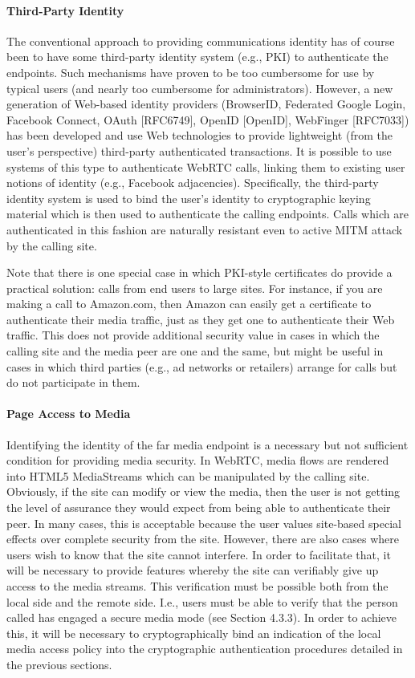 \documentclass{article}
\begin{document}
\paragraph{Third-Party Identity}

The conventional approach to providing communications identity has of
course been to have some third-party identity system (e.g., PKI) to
authenticate the endpoints.  Such mechanisms have proven to be too
cumbersome for use by typical users (and nearly too cumbersome for
administrators).  However, a new generation of Web-based identity
providers (BrowserID, Federated Google Login, Facebook Connect, OAuth
[RFC6749], OpenID [OpenID], WebFinger [RFC7033]) has been developed
and use Web technologies to provide lightweight (from the user's
perspective) third-party authenticated transactions.  It is possible
to use systems of this type to authenticate WebRTC calls, linking
them to existing user notions of identity (e.g., Facebook
adjacencies).  Specifically, the third-party identity system is used
to bind the user's identity to cryptographic keying material which is
then used to authenticate the calling endpoints.  Calls which are
authenticated in this fashion are naturally resistant even to active
MITM attack by the calling site.

Note that there is one special case in which PKI-style certificates
do provide a practical solution: calls from end users to large sites.
For instance, if you are making a call to Amazon.com, then Amazon can
easily get a certificate to authenticate their media traffic, just as
they get one to authenticate their Web traffic.  This does not
provide additional security value in cases in which the calling site
and the media peer are one and the same, but might be useful in cases
in which third parties (e.g., ad networks or retailers) arrange for
calls but do not participate in them.

\paragraph{Page Access to Media}

Identifying the identity of the far media endpoint is a necessary but
not sufficient condition for providing media security.  In WebRTC,
media flows are rendered into HTML5 MediaStreams which can be
manipulated by the calling site.  Obviously, if the site can modify
or view the media, then the user is not getting the level of
assurance they would expect from being able to authenticate their
peer.  In many cases, this is acceptable because the user values
site-based special effects over complete security from the site.
However, there are also cases where users wish to know that the site
cannot interfere.  In order to facilitate that, it will be necessary
to provide features whereby the site can verifiably give up access to
the media streams.  This verification must be possible both from the
local side and the remote side.  I.e., users must be able to verify
that the person called has engaged a secure media mode (see
Section 4.3.3).  In order to achieve this, it will be necessary to
cryptographically bind an indication of the local media access policy
into the cryptographic authentication procedures detailed in the
previous sections.
\end{document}
